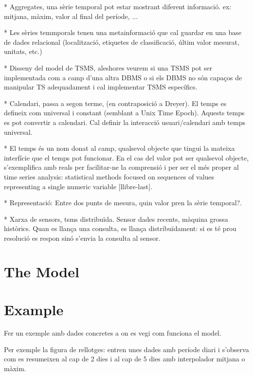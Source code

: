 \documentclass{scrartcl}
\begin{document}
* Aggregates, una sèrie temporal pot estar mostrant diferent informació. ex: mitjana, màxim, valor al final del període, ...

* Les sèries temmporals tenen una metainformació que cal guardar en una base de dades relacional (localització, etiquetes de classificació, últim valor mesurat, unitats, etc.)

* Disseny del model de TSMS, aleshores veurem si una TSMS pot ser implementada com a camp d'una altra DBMS o si els DBMS no són capaços de manipular TS adequadament i cal implementar TSMS específics.

* Calendari, passa a segon terme, (en contraposició a Dreyer). El temps es defineix com universal i constant (semblant a Unix Time Epoch). Aquests temps es pot convertir a calendari. Cal definir la interacció usuari/calendari amb temps universal.

* El temps és un nom donat al camp, qualsevol objecte que tingui la mateixa interfície que el temps pot funcionar. En el cas del valor pot ser qualsevol objecte, s'exemplifica amb reals per facilitar-ne la comprensió i per ser el més proper al time series analysis: statistical methods focused on sequences of values representing a single numeric variable [llibre-last].


* Representació: Entre dos punts de mesura, quin valor pren la sèrie temporal?.


* Xarxa de sensors, tsms distribuïda. Sensor dades recents, màquina grossa històrics. Quan es llança una consulta, es llança distribuïdament: si es té prou resolució es respon sinó s'envia la consulta al sensor. 




\section{The Model}










\section{Example}

Fer un exemple amb dades concretes a on es vegi com funciona el model.

Per exemple la figura de rellotges: entren unes dades amb període diari i s'observa com es resumeixen al cap de 2 dies i al cap de 5 dies amb interpolador mitjana o màxim.
\end{document}
